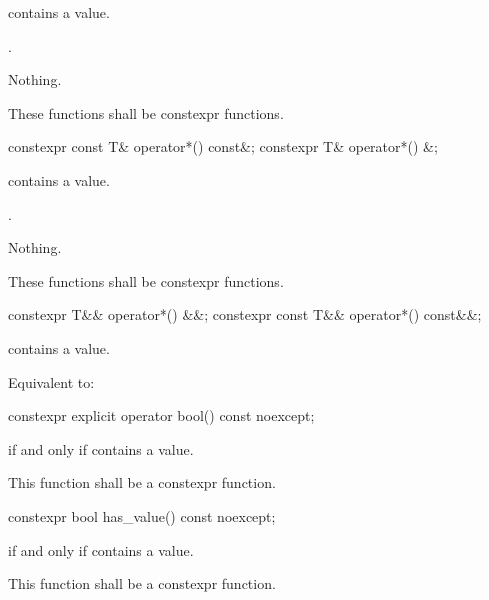 \begin{itemdescr}
\pnum
\requires
{} contains a value.

\pnum
\returns
{}.

\pnum
\throws
Nothing.

\pnum
\remarks
These functions shall be constexpr functions.
\end{itemdescr}

%
\begin{itemdecl}
constexpr const T& operator*() const&;
constexpr T& operator*() &;
\end{itemdecl}

\begin{itemdescr}
\pnum
\requires
{} contains a value.

\pnum
\returns
{}.

\pnum
\throws
Nothing.

\pnum
\remarks
These functions shall be constexpr functions.
\end{itemdescr}

%
\begin{itemdecl}
constexpr T&& operator*() &&;
constexpr const T&& operator*() const&&;
\end{itemdecl}

\begin{itemdescr}
\pnum
\requires
{} contains a value.

\pnum
\effects
Equivalent to: 
\end{itemdescr}

%
\begin{itemdecl}
constexpr explicit operator bool() const noexcept;
\end{itemdecl}

\begin{itemdescr}
\pnum
\returns
{} if and only if  contains a value.

\pnum
\remarks
This function shall be a constexpr function.
\end{itemdescr}

%
\begin{itemdecl}
constexpr bool has_value() const noexcept;
\end{itemdecl}

\begin{itemdescr}
\pnum
\returns {} if and only if  contains a value.

\pnum
\remarks This function shall be a constexpr function.
\end{itemdescr}

